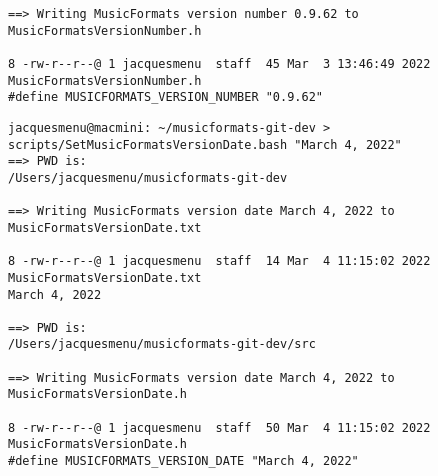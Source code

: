 \begin{enumerate}
\begin{lstlisting}[language=TerminalSmall]
==> Writing MusicFormats version number 0.9.62 to MusicFormatsVersionNumber.h

8 -rw-r--r--@ 1 jacquesmenu  staff  45 Mar  3 13:46:49 2022 MusicFormatsVersionNumber.h
#define MUSICFORMATS_VERSION_NUMBER "0.9.62"
\end{lstlisting}

\begin{lstlisting}[language=Terminal]
jacquesmenu@macmini: ~/musicformats-git-dev > scripts/SetMusicFormatsVersionDate.bash "March 4, 2022"
==> PWD is:
/Users/jacquesmenu/musicformats-git-dev

==> Writing MusicFormats version date March 4, 2022 to MusicFormatsVersionDate.txt

8 -rw-r--r--@ 1 jacquesmenu  staff  14 Mar  4 11:15:02 2022 MusicFormatsVersionDate.txt
March 4, 2022

==> PWD is:
/Users/jacquesmenu/musicformats-git-dev/src

==> Writing MusicFormats version date March 4, 2022 to MusicFormatsVersionDate.h

8 -rw-r--r--@ 1 jacquesmenu  staff  50 Mar  4 11:15:02 2022 MusicFormatsVersionDate.h
#define MUSICFORMATS_VERSION_DATE "March 4, 2022"
\end{lstlisting}

\end{enumerate}
